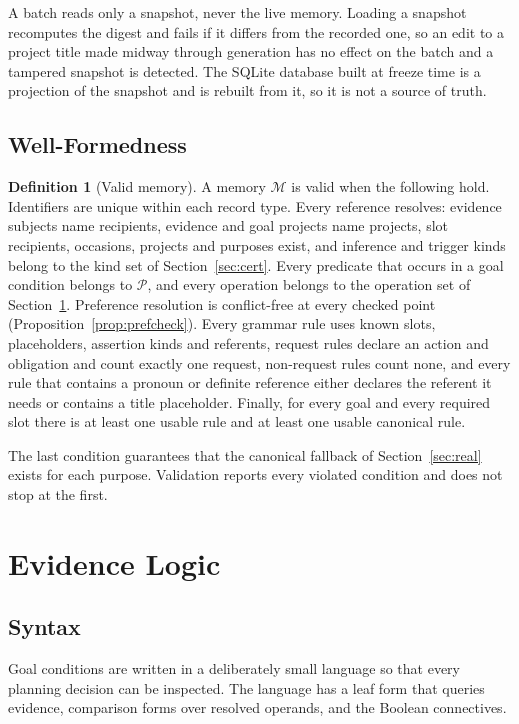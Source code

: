 \documentclass[11pt]{article}
\theoremstyle{definition}
\newtheorem{definition}[theorem]{Definition}
\theoremstyle{remark}
\begin{document}
A batch reads only a snapshot, never the live memory. Loading a snapshot recomputes the digest and fails if it differs from the recorded one, so an edit to a project title made midway through generation has no effect on the batch and a tampered snapshot is detected. The SQLite database built at freeze time is a projection of the snapshot and is rebuilt from it, so it is not a source of truth.

\subsection{Well-Formedness}

\begin{definition}[Valid memory]\label{def:valid}
A memory $\mathcal{M}$ is valid when the following hold. Identifiers are unique within each record type. Every reference resolves: evidence subjects name recipients, evidence and goal projects name projects, slot recipients, occasions, projects and purposes exist, and inference and trigger kinds belong to the kind set of Section~\ref{sec:cert}. Every predicate that occurs in a goal condition belongs to $\mathcal{P}$, and every operation belongs to the operation set of Section~\ref{sec:logic}. Preference resolution is conflict-free at every checked point (Proposition~\ref{prop:prefcheck}). Every grammar rule uses known slots, placeholders, assertion kinds and referents, request rules declare an action and obligation and count exactly one request, non-request rules count none, and every rule that contains a pronoun or definite reference either declares the referent it needs or contains a title placeholder. Finally, for every goal and every required slot there is at least one usable rule and at least one usable canonical rule.
\end{definition}

The last condition guarantees that the canonical fallback of Section~\ref{sec:real} exists for each purpose. Validation reports every violated condition and does not stop at the first.
\section{Evidence Logic}\label{sec:logic}

\subsection{Syntax}

Goal conditions are written in a deliberately small language so that every planning decision can be inspected. The language has a leaf form that queries evidence, comparison forms over resolved operands, and the Boolean connectives.
\end{document}

